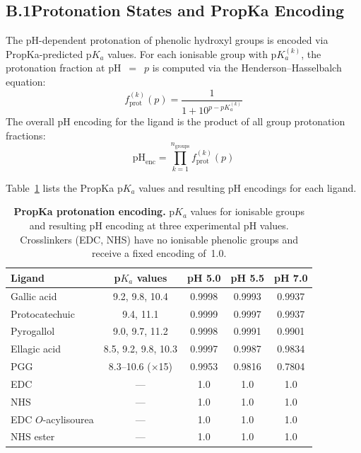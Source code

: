 \documentclass[11pt]{article}
\begin{document}
\subsection*{B.1\quad Protonation States and PropKa Encoding}

The pH-dependent protonation of phenolic hydroxyl groups is encoded
via PropKa-predicted p$K_a$ values.
For each ionisable group with p$K_a^{(k)}$, the protonation fraction at
pH~$=$~$p$ is computed via the Henderson--Hasselbalch equation:
\begin{equation}
  f_{\mathrm{prot}}^{(k)}(p) = \frac{1}{1 + 10^{p - pK_a^{(k)}}}
  \label{eq:propka}
\end{equation}
The overall pH encoding for the ligand is the product of all group
protonation fractions:
\begin{equation}
  \text{pH}_{\mathrm{enc}} = \prod_{k=1}^{n_{\mathrm{groups}}}
  f_{\mathrm{prot}}^{(k)}(p)
  \label{eq:ph_enc}
\end{equation}

\noindent
Table~\ref{tab:app_propka} lists the PropKa p$K_a$ values and resulting
pH encodings for each ligand.

\begin{table}[H]
\small
\centering
\caption{\textbf{PropKa protonation encoding.}
  p$K_a$ values for ionisable groups and resulting pH encoding at
  three experimental pH values. Crosslinkers (EDC, NHS) have no
  ionisable phenolic groups and receive a fixed encoding of~1.0.}
\label{tab:app_propka}
\begin{tabular}{lcccc}
\toprule
\textbf{Ligand} & \textbf{p$K_a$ values}
  & \textbf{pH 5.0} & \textbf{pH 5.5} & \textbf{pH 7.0} \\
\midrule
Gallic acid     & 9.2, 9.8, 10.4 & 0.9998 & 0.9993 & 0.9937 \\
Protocatechuic  & 9.4, 11.1      & 0.9999 & 0.9997 & 0.9937 \\
Pyrogallol      & 9.0, 9.7, 11.2 & 0.9998 & 0.9991 & 0.9901 \\
Ellagic acid    & 8.5, 9.2, 9.8, 10.3 & 0.9997 & 0.9987 & 0.9834 \\
PGG             & 8.3--10.6 ($\times$15) & 0.9953 & 0.9816 & 0.7804 \\
EDC             & --- & 1.0 & 1.0 & 1.0 \\
NHS             & --- & 1.0 & 1.0 & 1.0 \\
EDC $O$-acylisourea & --- & 1.0 & 1.0 & 1.0 \\
NHS ester       & --- & 1.0 & 1.0 & 1.0 \\
\bottomrule
\end{tabular}
\end{table}
\end{document}
